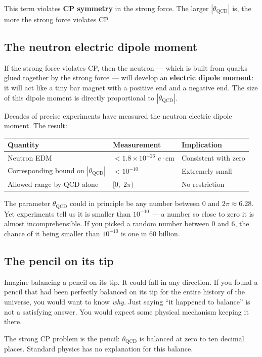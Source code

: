 \documentclass[11pt,a4paper]{article}
\newcommand{\term}[1]{\textbf{#1}}
\begin{document}
This term violates \textbf{CP symmetry} in the strong force.  The larger $|\theta_{\mathrm{QCD}}|$ is, the more the strong force violates CP.

\subsection{The neutron electric dipole moment}

If the strong force violates CP, then the neutron --- which is built from quarks glued together by the strong force --- will develop an \term{electric dipole moment}: it will act like a tiny bar magnet with a positive end and a negative end.  The size of this dipole moment is directly proportional to $|\theta_{\mathrm{QCD}}|$.

Decades of precise experiments have measured the neutron electric dipole moment.  The result:

\begin{center}
\begin{tabular}{lll}
\toprule
Quantity & Measurement & Implication \\
\midrule
Neutron EDM & $<\!1.8\times10^{-26}$ $e\cdot$cm & Consistent with zero \\
Corresponding bound on $|\theta_{\mathrm{QCD}}|$ & $<10^{-10}$ & Extremely small \\
Allowed range by QCD alone & $[0,\;2\pi)$ & No restriction \\
\bottomrule
\end{tabular}
\end{center}

\medskip
The parameter $\theta_{\mathrm{QCD}}$ could in principle be any number between 0 and $2\pi \approx 6.28$.  Yet experiments tell us it is smaller than $10^{-10}$ --- a number so close to zero it is almost incomprehensible.  If you picked a random number between 0 and 6, the chance of it being smaller than $10^{-10}$ is one in 60 billion.

\subsection{The pencil on its tip}

\begin{tcolorbox}[colback=boxgreen,colframe=green!50!black,title=Analogy: the balanced pencil]
Imagine balancing a pencil on its tip.  It could fall in any direction.  If you found a pencil that had been perfectly balanced on its tip for the entire history of the universe, you would want to know \emph{why}.  Just saying ``it happened to balance'' is not a satisfying answer.  You would expect some physical mechanism keeping it there.

The strong CP problem is the pencil: $\theta_{\mathrm{QCD}}$ is balanced at zero to ten decimal places.  Standard physics has no explanation for this balance.
\end{tcolorbox}
\end{document}
